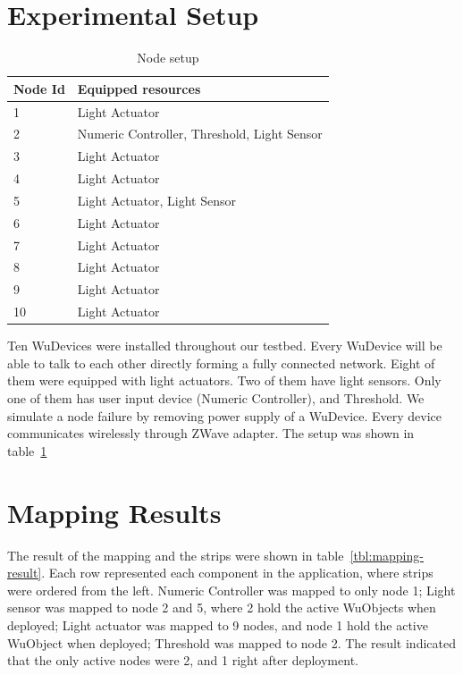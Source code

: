 \section{Experimental Setup}


\begin{table}
\centering
\caption{Node setup}
\label{tbl:setup}
  \begin{tabular}{|l|l|}
  \hline
  \textbf{Node Id} & \textbf{Equipped resources} \\
  \hline
  1 & Light Actuator \\
  \hline
  2 & Numeric Controller, Threshold, Light Sensor \\
  \hline
  3 & Light Actuator \\
  \hline
  4 & Light Actuator \\
  \hline
  5 & Light Actuator, Light Sensor \\
  \hline
  6 & Light Actuator \\
  \hline
  7 & Light Actuator \\
  \hline
  8 & Light Actuator \\
  \hline
  9 & Light Actuator \\
  \hline
  10 & Light Actuator \\
  \hline
  \end{tabular}
\end{table}

Ten WuDevices were installed throughout our testbed. Every WuDevice will be
able to talk to each other directly forming a fully connected network. Eight of them were
equipped with light actuators. Two of them have light sensors. Only one of them
has user input device (Numeric Controller), and Threshold. We simulate a node
failure by removing power supply of a WuDevice. Every device communicates
wirelessly through ZWave adapter. The setup was shown in table~\ref{tbl:setup}

\section{Mapping Results}

The result of the mapping and the strips were shown in
table~\ref{tbl:mapping-result}. Each row represented each component in the
application, where strips were ordered from the left. Numeric Controller was
mapped to only node 1; Light sensor was mapped to node 2 and 5, where 2 hold the
active WuObjects when deployed; Light actuator was mapped to 9 nodes, and node
1 hold the active WuObject when deployed; Threshold was mapped to node 2.  The
result indicated that the only active nodes were 2, and 1 right after deployment.


